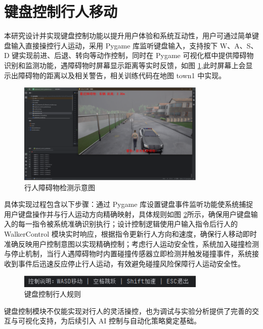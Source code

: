 \section{键盘控制行人移动}
本研究设计并实现键盘控制功能以提升用户体验和系统互动性，用户可通过简单键盘输入直接操控行人运动，采用 Pygame 库监听键盘输入，支持按下 W、A、S、D 键实现前进、后退、转向等动作控制，同时在 Pygame 可视化框中提供障碍物识别和监测功能，遇障碍物时屏幕显示距离等实时反馈，如图 \ref{fig:collision_detection},此时屏幕上会显示出障碍物的距离以及相关警告，相关训练代码在地图 town1 中实现。

\begin{figure}[H]
    \centering
    \includegraphics[width=0.8\textwidth]{images/collision_detection.pdf}
    \caption{行人障碍物检测示意图}
    \label{fig:collision_detection}
\end{figure}

具体实现过程包含以下步骤：通过 Pygame 库设置键盘事件监听功能使系统捕捉用户键盘操作并与行人运动方向精确映射，具体规则如图 \ref{fig:keyboard_control}所示，确保用户键盘输入的每一指令被系统准确识别执行；设计控制逻辑使用户输入指令后行人的 WalkerControl 模块实时响应，根据指令更新行人方向和速度，确保行人移动即时准确反映用户控制意图以实现精确控制；考虑行人运动安全性，系统加入碰撞检测与停止机制，当行人遇障碍物时内置碰撞传感器立即检测并触发碰撞事件，系统接收到事件后迅速反应停止行人运动，有效避免碰撞风险保障行人运动安全性。

\begin{figure}[H]
    \centering
    \includegraphics[width=0.8\textwidth]{images/keyboard_control.pdf}
    \caption{键盘控制行人规则}
    \label{fig:keyboard_control}
\end{figure}

键盘控制模块不仅能实现对行人的灵活操控，也为调试与实验分析提供了完善的交互与可视化支持，为后续引入 AI 控制与自动化策略奠定基础。
